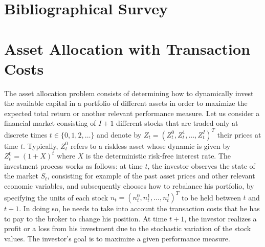 \section{Bibliographical Survey}
\label{sec:bibliographical_survey}


\section{Asset Allocation with Transaction Costs}
\label{sec:asset_allocation_with_transaction_costs}

The asset allocation problem consists of determining how to dynamically invest
the available capital in a portfolio of different assets in order to maximize
the expected total return or another relevant performance measure. Let us
consider a financial market consisting of $I+1$ different stocks that are
traded only at discrete times $t \in \{0, 1, 2, \ldots\}$ and denote by
${Z}_t = {(Z_t^0, Z_t^1, \ldots, Z_t^I)}^T$ their prices at time $t$.
Typically, $Z_t^0$ refers to a riskless asset whose dynamic is given by $Z_t^0
= {(1 + X)}^t$ where $X$ is the deterministic risk-free interest rate. The
investment process works as follows: at time $t$, the investor observes the
state of the market $S_t$, consisting for example of the past asset prices and
other relevant economic variables, and subsequently chooses how to rebalance
his portfolio, by specifying the units of each stock ${n}_t = {(n_t^0 ,
n_t^1 , \ldots , n_t^I)}^T$ to be held between $t$ and $t+1$. In doing so, he
needs to take into account the transaction costs that he has to pay to the
broker to change his position.  At time $t+1$, the investor realizes a profit
or a loss from his investment due to the stochastic variation of the stock
values. The investor’s goal is to maximize a given performance measure.

